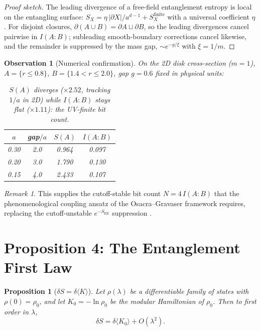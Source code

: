 \documentclass[11pt,a4paper]{article}
\newtheorem{proposition}{Proposition}
\newtheorem{observation}{Observation}
\theoremstyle{definition}
\theoremstyle{remark}
\newtheorem{remark}{Remark}
\newcommand{\EE}{\mathrm{EE}}
\begin{document}
\begin{proof}[Proof sketch]
The leading divergence of a free-field entanglement entropy is local on the
entangling surface: $S_X = \eta\,|\partial X|/a^{d-1} + S_X^{\mathrm{finite}}$
with a universal coefficient $\eta$ \cite{CasiniHuerta2009}. For disjoint
closures, $\partial(A\cup B) = \partial A \sqcup \partial B$, so the leading
divergences cancel pairwise in $I(A\!:\!B)$; subleading smooth-boundary
corrections cancel likewise, and the remainder is suppressed by the mass gap,
$\sim e^{-g/\xi}$ with $\xi = 1/m$.
\end{proof}

\begin{observation}[Numerical confirmation]
On the 2D disk cross-section ($m = 1$), $A = \{r \le 0.8\}$,
$B = \{1.4 < r \le 2.0\}$, gap $g = 0.6$ fixed in physical units:
\begin{table}[h]
\centering
\begin{tabular}{cccc}
\toprule
$a$ & gap$/a$ & $S(A)$ & $I(A\!:\!B)$ \\
\midrule
0.30 & 2.0 & 0.964 & 0.097 \\
0.20 & 3.0 & 1.790 & 0.130 \\
0.15 & 4.0 & 2.433 & 0.107 \\
\bottomrule
\end{tabular}
\caption{$S(A)$ diverges ($\times 2.52$, tracking $1/a$ in 2D) while
$I(A\!:\!B)$ stays flat ($\times 1.11$): the UV-finite bit count.}
\label{tab:mi}
\end{table}
\end{observation}

\begin{remark}
This supplies the cutoff-stable bit count $N = 4\,I(A\!:\!B)$ that the
phenomenological coupling ansatz of the Osacra--Gravaser framework requires,
replacing the cutoff-unstable $e^{-S_{\EE}}$ suppression
\cite{TheoryReview}.
\end{remark}

\section{Proposition 4: The Entanglement First Law}
\label{prop:firstlaw}

\begin{proposition}[$\delta S = \delta\langle K\rangle$]
\label{thm:firstlaw}
Let $\rho(\lambda)$ be a differentiable family of states with
$\rho(0) = \rho_0$, and let $K_0 = -\ln\rho_0$ be the modular Hamiltonian of
$\rho_0$. Then to first order in $\lambda$,
\begin{equation}
\delta S = \delta\langle K_0\rangle + O(\lambda^2).
\end{equation}
\end{proposition}
\end{document}
